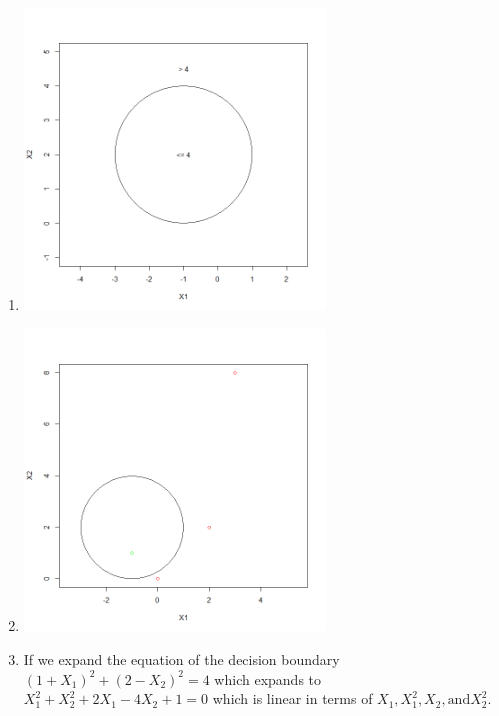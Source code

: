 \documentclass{article}
\begin{document}
\begin{enumerate}
\begin{enumerate}
        \item
        
        \begin{center}
            \includegraphics[width=8cm]{HW4_5b.png}
        \end{center}
        
        \item
        
        \begin{center}
            \includegraphics[width=8cm]{HW4_5c.png}
        \end{center}
        
        \item
        
        If we expand the equation of the decision boundary $(1 + X_1)^2 + (2 - X_2)^2 = 4$ which expands to $X_1^2 + X_2^2 + 2X_1 - 4X_2 + 1 = 0$ which is linear in terms of $X_1, X_1^2, X_2, \text{and} X_2^2.$
        
    \end{enumerate}
    

\end{enumerate}
\end{document}
